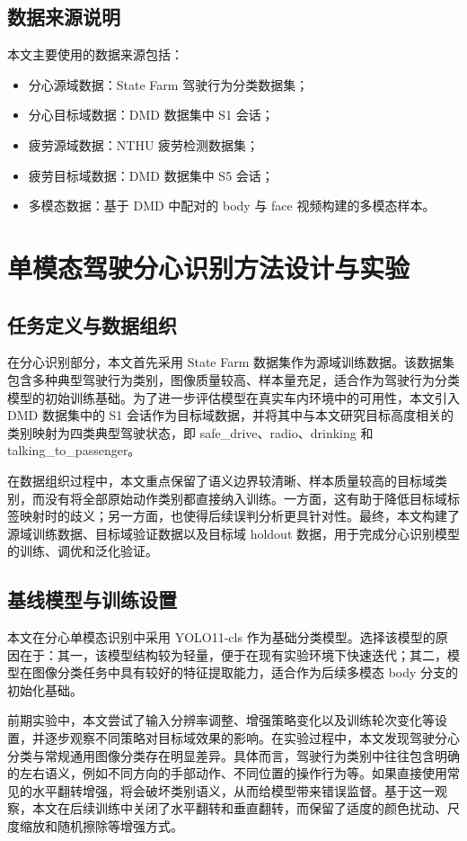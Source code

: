 \documentclass[12pt]{ctexrep}
\begin{document}
\section{数据来源说明}
本文主要使用的数据来源包括：

\begin{itemize}
    \item 分心源域数据：State Farm 驾驶行为分类数据集；
    \item 分心目标域数据：DMD 数据集中 S1 会话；
    \item 疲劳源域数据：NTHU 疲劳检测数据集；
    \item 疲劳目标域数据：DMD 数据集中 S5 会话；
    \item 多模态数据：基于 DMD 中配对的 body 与 face 视频构建的多模态样本。
\end{itemize}

\chapter{单模态驾驶分心识别方法设计与实验}

\section{任务定义与数据组织}
在分心识别部分，本文首先采用 State Farm 数据集作为源域训练数据。该数据集包含多种典型驾驶行为类别，图像质量较高、样本量充足，适合作为驾驶行为分类模型的初始训练基础。为了进一步评估模型在真实车内环境中的可用性，本文引入 DMD 数据集中的 S1 会话作为目标域数据，并将其中与本文研究目标高度相关的类别映射为四类典型驾驶状态，即 safe\_drive、radio、drinking 和 talking\_to\_passenger。

在数据组织过程中，本文重点保留了语义边界较清晰、样本质量较高的目标域类别，而没有将全部原始动作类别都直接纳入训练。一方面，这有助于降低目标域标签映射时的歧义；另一方面，也使得后续误判分析更具针对性。最终，本文构建了源域训练数据、目标域验证数据以及目标域 holdout 数据，用于完成分心识别模型的训练、调优和泛化验证。

\section{基线模型与训练设置}
本文在分心单模态识别中采用 YOLO11-cls 作为基础分类模型。选择该模型的原因在于：其一，该模型结构较为轻量，便于在现有实验环境下快速迭代；其二，模型在图像分类任务中具有较好的特征提取能力，适合作为后续多模态 body 分支的初始化基础。

前期实验中，本文尝试了输入分辨率调整、增强策略变化以及训练轮次变化等设置，并逐步观察不同策略对目标域效果的影响。在实验过程中，本文发现驾驶分心分类与常规通用图像分类存在明显差异。具体而言，驾驶行为类别中往往包含明确的左右语义，例如不同方向的手部动作、不同位置的操作行为等。如果直接使用常见的水平翻转增强，将会破坏类别语义，从而给模型带来错误监督。基于这一观察，本文在后续训练中关闭了水平翻转和垂直翻转，而保留了适度的颜色扰动、尺度缩放和随机擦除等增强方式。
\end{document}
